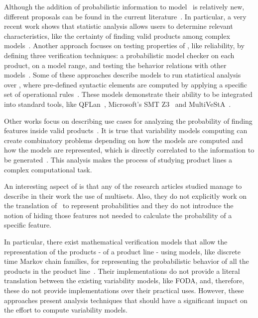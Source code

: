 Although the addition of probabilistic information to model \SPLs\ is relatively new, different proposals can be found in the current literature~\cite{chssgl13,tllv15,tlll15,dpcslsh17}. In particular, a very recent
work shows that statistic analysis allows users to determine relevant characteristics, like the certainty of finding valid products among complex models~\cite{dpcslsh17}.
%
Another approach focuses on testing properties of \SPLs, like reliability, by defining three verification techniques: a probabilistic model checker on each product, on a model range, and testing the behavior relations with other models~\cite{chssgl13}.
%
Some of these approaches describe models to run statistical analysis over \SPLs, where pre-defined syntactic elements are computed by applying a specific set of operational rules~\cite{tllv15,tlll15}. These models demonstrate their ability to be integrated into standard tools, like QFLan~\cite{tlll15}, Microsoft's SMT Z3~\cite{ln08} and MultiVeStA~\cite{sa13}.
%
%

Other works focus on describing use cases for analyzing the probability of finding features inside valid products~\cite{dpcslsh17}.
It is true that variability models computing can create combinatory problems
depending on how the models are computed and how the models are represented, which is directly
correlated to the information to be generated~\cite{dpcslsh17}.
This analysis makes the process of studying product lines a complex computational  task.

An interesting aspect of \fodaPAp is that
any of the research articles studied manage
to describe in their work the use of multisets.
Also, they do not explicitly work on
the translation of \FODA\ to represent probabilities and they do
not introduce the notion of hiding those features not needed to
calculate the probability of a specific feature.

In particular, there exist mathematical verification models that
allow the representation of the products - of a product line - using models,
like discrete time Markov chain families, for representing the probabilistic behavior of all
the products in the product line~\cite{vk13}. Their implementations do not
provide a literal translation between the existing variability models, like FODA,
and, therefore, these do not provide implementations over their practical uses.
However, these approaches present analysis techniques that should have
a significant impact on the effort to compute variability models.

